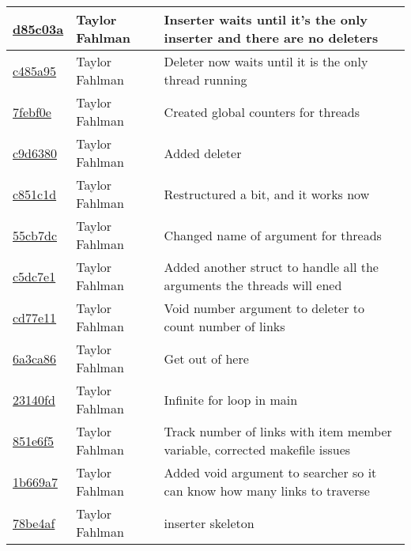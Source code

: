 \begin{tabular}{l l l}
\href{https://github.com/fahlmant/cs444/commit/d85c03a6b857f72891efa170e38dc11395d77ae4}{d85c03a} & Taylor Fahlman & Inserter waits until it's the only inserter and there are no deleters\\\hline
\href{https://github.com/fahlmant/cs444/commit/c485a95c353e793a843ad6bdac4eea06562e642a}{c485a95} & Taylor Fahlman & Deleter now waits until it is the only thread running\\\hline
\href{https://github.com/fahlmant/cs444/commit/7febf0eb7674a18771178778a1b1b246e9722602}{7febf0e} & Taylor Fahlman & Created global counters for threads\\\hline
\href{https://github.com/fahlmant/cs444/commit/c9d63807d789e377e196ce1a94e3320a7514a901}{c9d6380} & Taylor Fahlman & Added deleter\\\hline
\href{https://github.com/fahlmant/cs444/commit/c851c1dc8be7c97ca7bbbe94fa9d80150763d259}{c851c1d} & Taylor Fahlman & Restructured a bit, and it works now\\\hline
\href{https://github.com/fahlmant/cs444/commit/55cb7dc0b437c2cc03c1a7683558cd48dd96c634}{55cb7dc} & Taylor Fahlman & Changed name of argument for threads\\\hline
\href{https://github.com/fahlmant/cs444/commit/c5dc7e1f2b65460a3e119935f06968ed0f8b2691}{c5dc7e1} & Taylor Fahlman & Added another struct to handle all the arguments the threads will ened\\\hline
\href{https://github.com/fahlmant/cs444/commit/cd77e11202390d5f7cdad25b2e5ecfa5d42f7dcd}{cd77e11} & Taylor Fahlman & Void number argument to deleter to count number of links\\\hline
\href{https://github.com/fahlmant/cs444/commit/6a3ca86d0ff1a6e3894d9f03838f423564d0a755}{6a3ca86} & Taylor Fahlman & Get out of here\\\hline
\href{https://github.com/fahlmant/cs444/commit/23140fd4536d1b8552c0db457dcfa4e2b8161635}{23140fd} & Taylor Fahlman & Infinite for loop in main\\\hline
\href{https://github.com/fahlmant/cs444/commit/851e6f51a0b171ec4deac5923320cae97a549be6}{851e6f5} & Taylor Fahlman & Track number of links with item member variable, corrected makefile issues\\\hline
\href{https://github.com/fahlmant/cs444/commit/1b669a7f2ee9d13ba60e92be4d83db9569866bfc}{1b669a7} & Taylor Fahlman & Added void argument to searcher so it can know how many links to traverse\\\hline
\href{https://github.com/fahlmant/cs444/commit/78be4afe0b06da4185d41362312d3d124971ac9c}{78be4af} & Taylor Fahlman & inserter skeleton\\\hline

\end{tabular}
